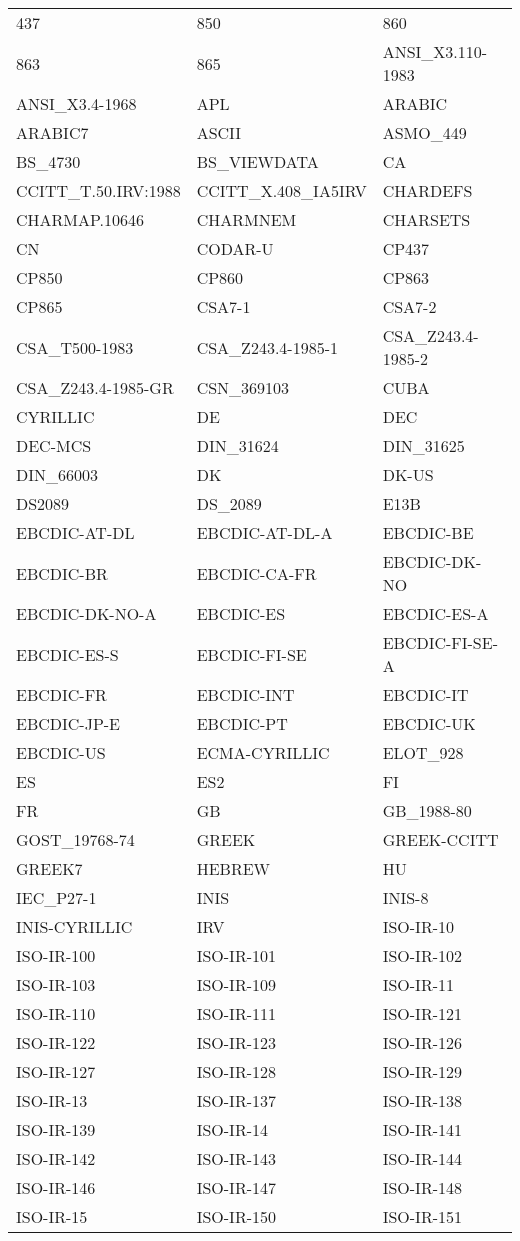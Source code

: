 \begin {tabular} {l l l}
437 & 850 & 860 \\
863 & 865 & ANSI\_X3.110-1983 \\
ANSI\_X3.4-1968 & APL & ARABIC \\
ARABIC7 & ASCII & ASMO\_449 \\
BS\_4730 & BS\_VIEWDATA & CA \\
CCITT\_T.50.IRV:1988 & CCITT\_X.408\_IA5IRV & CHARDEFS \\
CHARMAP.10646 & CHARMNEM & CHARSETS \\
CN & CODAR-U & CP437 \\
CP850 & CP860 & CP863 \\
CP865 & CSA7-1 & CSA7-2 \\
CSA\_T500-1983 & CSA\_Z243.4-1985-1 & CSA\_Z243.4-1985-2 \\
CSA\_Z243.4-1985-GR & CSN\_369103 & CUBA \\
CYRILLIC & DE & DEC \\
DEC-MCS & DIN\_31624 & DIN\_31625 \\
DIN\_66003 & DK & DK-US \\
DS2089 & DS\_2089 & E13B \\
EBCDIC-AT-DL & EBCDIC-AT-DL-A & EBCDIC-BE \\
EBCDIC-BR & EBCDIC-CA-FR & EBCDIC-DK-NO \\
EBCDIC-DK-NO-A & EBCDIC-ES & EBCDIC-ES-A \\
EBCDIC-ES-S & EBCDIC-FI-SE & EBCDIC-FI-SE-A \\
EBCDIC-FR & EBCDIC-INT & EBCDIC-IT \\
EBCDIC-JP-E & EBCDIC-PT & EBCDIC-UK \\
EBCDIC-US & ECMA-CYRILLIC & ELOT\_928 \\
ES & ES2 & FI \\
FR & GB & GB\_1988-80 \\
GOST\_19768-74 & GREEK & GREEK-CCITT \\
GREEK7 & HEBREW & HU \\
IEC\_P27-1 & INIS & INIS-8 \\
INIS-CYRILLIC & IRV & ISO-IR-10 \\
ISO-IR-100 & ISO-IR-101 & ISO-IR-102 \\
ISO-IR-103 & ISO-IR-109 & ISO-IR-11 \\
ISO-IR-110 & ISO-IR-111 & ISO-IR-121 \\
ISO-IR-122 & ISO-IR-123 & ISO-IR-126 \\
ISO-IR-127 & ISO-IR-128 & ISO-IR-129 \\
ISO-IR-13 & ISO-IR-137 & ISO-IR-138 \\
ISO-IR-139 & ISO-IR-14 & ISO-IR-141 \\
ISO-IR-142 & ISO-IR-143 & ISO-IR-144 \\
ISO-IR-146 & ISO-IR-147 & ISO-IR-148 \\
ISO-IR-15 & ISO-IR-150 & ISO-IR-151 \\
\end {tabular}

